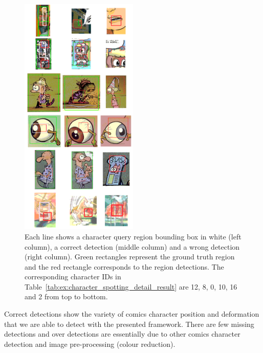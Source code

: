 \begin{figure}[!h]  %
   \centering
  \includegraphics[width=0.5\textwidth]{result_exemples.png}
  \caption[Character spotting result sample]{
  Each line shows a character query region bounding box in white (left column), a correct detection (middle column) and a wrong detection (right column). Green rectangles represent the ground truth region and the red rectangle corresponds to the region detections. The corresponding character IDs in Table~\ref{tab:ex:character_spotting_detail_result} are 12, 8, 0, 10, 16 and 2 from top to bottom. %
  }
  \label{fig:ex:character_spotting_results}
 \end{figure}

Correct detections show the variety of comics character position and deformation that we are able to detect with the presented framework. There are few missing detections and over detections are essentially due to other comics character detection and image pre-processing (colour reduction).

